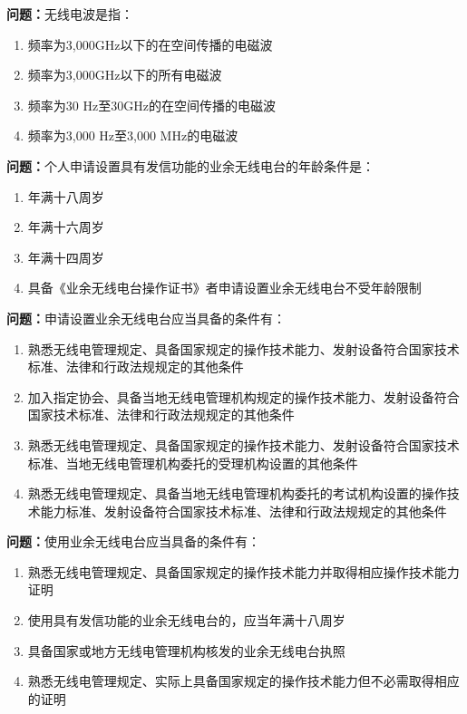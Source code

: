 \noindent\textbf{问题：}无线电波是指：
\begin{enumerate}[label=\Alph*), leftmargin=3em]
\item 频率为3,000GHz以下的在空间传播的电磁波
\item 频率为3,000GHz以下的所有电磁波
\item 频率为30 Hz至30GHz的在空间传播的电磁波
\item 频率为3,000 Hz至3,000 MHz的电磁波
\end{enumerate}

\bigskip


\noindent\textbf{问题：}个人申请设置具有发信功能的业余无线电台的年龄条件是：
\begin{enumerate}[label=\Alph*), leftmargin=3em]
\item 年满十八周岁
\item 年满十六周岁
\item 年满十四周岁
\item 具备《业余无线电台操作证书》者申请设置业余无线电台不受年龄限制
\end{enumerate}

\bigskip


\noindent\textbf{问题：}申请设置业余无线电台应当具备的条件有：
\begin{enumerate}[label=\Alph*), leftmargin=3em]
\item 熟悉无线电管理规定、具备国家规定的操作技术能力、发射设备符合国家技术标准、法律和行政法规规定的其他条件
\item 加入指定协会、具备当地无线电管理机构规定的操作技术能力、发射设备符合国家技术标准、法律和行政法规规定的其他条件
\item 熟悉无线电管理规定、具备国家规定的操作技术能力、发射设备符合国家技术标准、当地无线电管理机构委托的受理机构设置的其他条件
\item 熟悉无线电管理规定、具备当地无线电管理机构委托的考试机构设置的操作技术能力标准、发射设备符合国家技术标准、法律和行政法规规定的其他条件
\end{enumerate}

\bigskip


\noindent\textbf{问题：}使用业余无线电台应当具备的条件有：
\begin{enumerate}[label=\Alph*), leftmargin=3em]
\item 熟悉无线电管理规定、具备国家规定的操作技术能力并取得相应操作技术能力证明
\item 使用具有发信功能的业余无线电台的，应当年满十八周岁
\item 具备国家或地方无线电管理机构核发的业余无线电台执照
\item 熟悉无线电管理规定、实际上具备国家规定的操作技术能力但不必需取得相应的证明
\end{enumerate}

